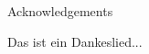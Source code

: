 %

\pagestyle{empty}
\thispagestyle{empty}
\begin{center}
\thispagestyle{empty}
   \huge Acknowledgements
\thispagestyle{empty}
\end{center}

\thispagestyle{empty}
Das ist ein Dankeslied...
\cleardoublepage
\pagebreak

